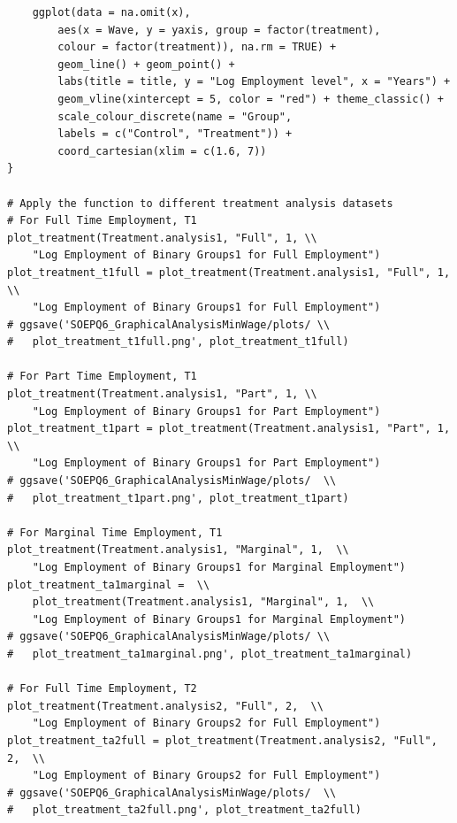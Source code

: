\documentclass[a4paper]{article}
\begin{document}
{\begin{lstlisting}
    ggplot(data = na.omit(x), 
    	aes(x = Wave, y = yaxis, group = factor(treatment), 
        colour = factor(treatment)), na.rm = TRUE) + 
        geom_line() + geom_point() + 
        labs(title = title, y = "Log Employment level", x = "Years") + 
        geom_vline(xintercept = 5, color = "red") + theme_classic() + 
        scale_colour_discrete(name = "Group", 
        labels = c("Control", "Treatment")) + 
        coord_cartesian(xlim = c(1.6, 7))
}

# Apply the function to different treatment analysis datasets 
# For Full Time Employment, T1
plot_treatment(Treatment.analysis1, "Full", 1, \\
	"Log Employment of Binary Groups1 for Full Employment")
plot_treatment_t1full = plot_treatment(Treatment.analysis1, "Full", 1, \\
	"Log Employment of Binary Groups1 for Full Employment")
# ggsave('SOEPQ6_GraphicalAnalysisMinWage/plots/ \\
#	plot_treatment_t1full.png', plot_treatment_t1full)

# For Part Time Employment, T1
plot_treatment(Treatment.analysis1, "Part", 1, \\
	"Log Employment of Binary Groups1 for Part Employment")
plot_treatment_t1part = plot_treatment(Treatment.analysis1, "Part", 1,  \\
	"Log Employment of Binary Groups1 for Part Employment")
# ggsave('SOEPQ6_GraphicalAnalysisMinWage/plots/  \\
#	plot_treatment_t1part.png', plot_treatment_t1part)

# For Marginal Time Employment, T1
plot_treatment(Treatment.analysis1, "Marginal", 1,  \\
	"Log Employment of Binary Groups1 for Marginal Employment")
plot_treatment_ta1marginal =  \\
	plot_treatment(Treatment.analysis1, "Marginal", 1,  \\
	"Log Employment of Binary Groups1 for Marginal Employment")
# ggsave('SOEPQ6_GraphicalAnalysisMinWage/plots/ \\
#	plot_treatment_ta1marginal.png', plot_treatment_ta1marginal) 

# For Full Time Employment, T2
plot_treatment(Treatment.analysis2, "Full", 2,  \\
	"Log Employment of Binary Groups2 for Full Employment")
plot_treatment_ta2full = plot_treatment(Treatment.analysis2, "Full", 2,  \\
	"Log Employment of Binary Groups2 for Full Employment")
# ggsave('SOEPQ6_GraphicalAnalysisMinWage/plots/  \\
#	plot_treatment_ta2full.png', plot_treatment_ta2full) 


\end{lstlisting}}
\end{document}
